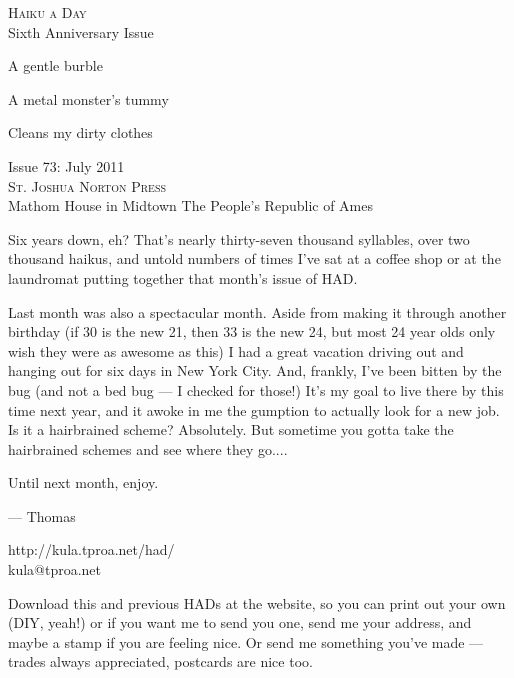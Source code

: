 \documentclass[12pt]{article}
\begin{document}
\begin{center}
{\fontsize{36}{48}\selectfont \textsc{Haiku a Day }} \\
Sixth Anniversary Issue
\end{center}

\vspace*{3.5cm}

{\fontsize{20}{40}\selectfont 

A gentle burble

A metal monster's tummy

Cleans my dirty clothes


}

\vspace*{5.0cm}
\begin{center}
{\large{Issue 73: July 2011}} \\[5mm]
{\fontsize{8}{8}\selectfont  \textsc{ St. Joshua Norton Press }} \\[1mm]
{\fontsize{6}{6}\selectfont Mathom House in Midtown \textbar The People's Republic of Ames }
\end{center}


\newpage

Six years down, eh? That's nearly thirty-seven thousand syllables, over two
thousand haikus, and untold numbers of times I've sat at a coffee shop or
at the laundromat putting together that month's issue of HAD. 

Last month was also a spectacular month. Aside from making it through another
birthday (if 30 is the new 21, then 33 is the new 24, but most 24 year olds
only wish they were as awesome as this) I had a great vacation driving out
and hanging out for six days in New York City. And, frankly, I've been bitten
by the bug (and not a bed bug --- I checked for those!) It's my goal to live
there by this time next year, and it awoke in me the gumption to actually
look for a new job. Is it a hairbrained scheme? Absolutely. But sometime
you gotta take the hairbrained schemes and see where they go....

Until next month, enjoy.



--- Thomas

http://kula.tproa.net/had/ \\
kula@tproa.net

Download this and previous HADs at the website, so you can
print out your own (DIY, yeah!) or if you want me to send
you one, send me your address, and maybe a stamp if you
are feeling nice. Or send me something you've made ---
trades always appreciated, postcards are nice too.
\end{document}
